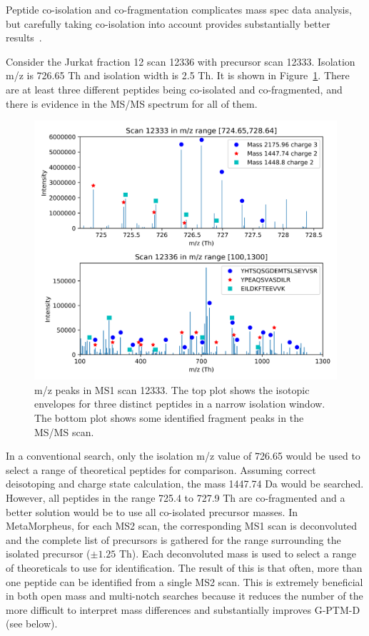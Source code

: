 \documentclass[journal=jprobs,manuscript=article]{achemso}
\begin{document}
Peptide co-isolation and co-fragmentation complicates mass spec data analysis, but carefully taking co-isolation into account provides substantially better results~\cite{Zhang2014}.

Consider the Jurkat fraction 12 scan 12336 with precursor scan 12333.
Isolation m/z is 726.65 Th and isolation width is 2.5 Th.
It is shown in Figure~\ref{fig:fig5-coIsolationSpectrum}.
There are at least three different peptides being co-isolated and co-fragmented, and there is evidence in the MS/MS spectrum for all of them.

\begin{figure}[H]
\includegraphics{fig5-coIsolationSpectrum.png}
\caption{m/z peaks in MS1 scan 12333. The top plot shows the isotopic envelopes for three distinct peptides in a narrow isolation window. The bottom plot shows some identified fragment peaks in the MS/MS scan.}
\label{fig:fig5-coIsolationSpectrum}
\end{figure}

In a conventional search, only the isolation m/z value of 726.65 would be used to select a range of theoretical peptides for comparison.
Assuming correct deisotoping and charge state calculation, the mass 1447.74 Da would be searched.
However, all peptides in the range 725.4 to 727.9 Th are co-fragmented and a better solution would be to use all co-isolated precursor masses.
In MetaMorpheus, for each MS2 scan, the corresponding MS1 scan is deconvoluted and the complete list of precursors is gathered for the range surrounding the isolated precursor ($\pm 1.25$ Th).
Each deconvoluted mass is used to select a range of theoreticals to use for identification.
The result of this is that often, more than one peptide can be identified from a single MS2 scan.
This is extremely beneficial in both open mass and multi-notch searches because it reduces the number of the more difficult to interpret mass differences and substantially improves G-PTM-D (see below).
\end{document}
